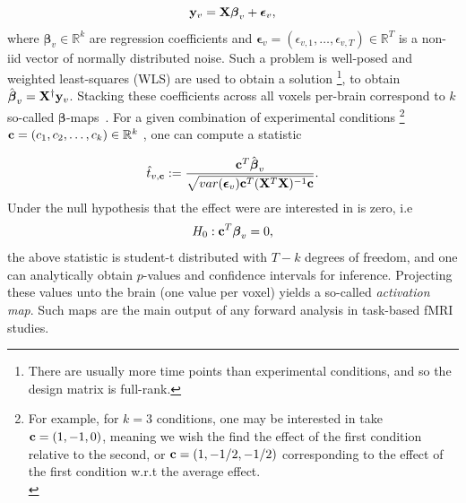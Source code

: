\begin{equation}
  \mathbf{y}_v = \mathbf{X}\boldsymbol{\beta}_v + \boldsymbol{\epsilon}_v,
\end{equation}
where $\boldsymbol{\beta}_v \in \mathbb R^k$ are regression coefficients and $\boldsymbol{\epsilon}_v = (\epsilon_{v,1},\ldots,\epsilon_{v,T}) \in \mathbb R^T$ is a non-iid vector of normally distributed noise.
Such a problem is well-posed and weighted least-squares (WLS) are used to obtain a solution
\footnote{There are usually more time points than experimental conditions, and so the design matrix is full-rank.},
to obtain $\hat{\boldsymbol{\beta}}_v = \mathbf{X}^\dagger\mathbf{y}_v$.  Stacking these coefficients across all voxels per-brain correspond to $k$ so-called $\boldsymbol{\beta}$-maps~\citep{friston1994statistical}. For a given combination of experimental conditions \footnote{For example, for $k = 3$ conditions, one may be interested in take $\mathbf{c} = (1, -1, 0)$, meaning we wish the find the effect of the first condition relative to the second, or $\mathbf{c}=(1,-1/2,-1/2)$ corresponding to the effect of the first condition w.r.t the average effect.\\}
$\mathbf{c}  = (c_1,c_2,\ldots,c_k)\in \mathbb R^k$ , one can compute a statistic

\begin{equation}
\hat{t}_{v,\mathbf{c}} := \frac{\mathbf{c}^T\hat{\boldsymbol{\beta}}_v}{\sqrt{var(\boldsymbol{\epsilon}_v)\mathbf{c}^T(\mathbf{X}^T\mathbf{X})^{-1}\mathbf{c}}}.
\end{equation}
Under the null hypothesis that the effect were are interested in is zero, i.e
\begin{equation}
  H_0: \mathbf{c}^T\boldsymbol{\beta}_v = 0,
\end{equation}
the above statistic is student-t distributed with $T-k$ degrees of freedom, and one can
analytically obtain $p$-values and confidence intervals for inference. Projecting these values unto the brain (one value per voxel) yields a so-called \textit{activation map}. Such maps are the main output of any forward analysis in task-based fMRI studies.

